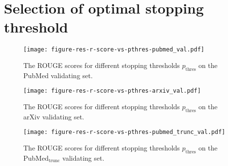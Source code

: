 \documentclass[11pt]{article}
\begin{document}
\begin{table}
\centering
{}
\caption{ \label{tab:extraction_time_analysis} Average extractive summarization time of  MemSum on different datasets.}
\end{table}


\section{Selection of optimal stopping threshold}
\label{sec:selection_of_optimal}
\begin{figure}[ht]
\centering
  \texttt{[image: figure-res-r-score-vs-pthres-pubmed\_val.pdf]}
  \caption{The ROUGE scores for different stopping thresholds $p_\text{thres}$ on the PubMed validating set.}
  \label{fig:pthres_pubmed}
\end{figure}

\begin{figure}[ht]
\centering
  \texttt{[image: figure-res-r-score-vs-pthres-arxiv\_val.pdf]}
  \caption{The ROUGE scores for different stopping thresholds $p_\text{thres}$ on the arXiv validating set.}
  \label{fig:pthres_arxiv}
\end{figure}
\begin{figure}[ht]
\centering
  \texttt{[image: figure-res-r-score-vs-pthres-pubmed\_trunc\_val.pdf]}
  \caption{The ROUGE scores for different stopping thresholds $p_\text{thres}$ on the PubMed$_\text{trunc}$ validating set.}
  \label{fig:pthres_pubmed_trunc}
\end{figure}
\end{document}
